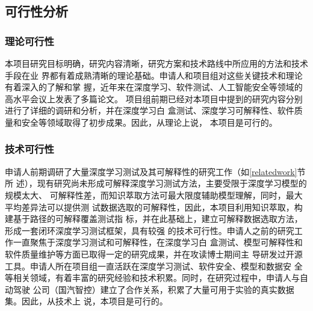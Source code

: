 \subsection{可行性分析}

\subsubsection{理论可行性}

本项目研究目标明确，研究内容清晰，研究方案和技术路线中所应用的方法和技术手段在业
界都有着成熟清晰的理论基础。申请人和项目组对这些关键技术和理论有着深入的了解和掌
握，近年来在深度学习、软件测试、人工智能安全等领域的高水平会议上发表了多篇论文。
项目组前期已经对本项目中提到的研究内容分别进行了详细的调研和分析，并在深度学习白
盒测试、深度学习可解释性、软件质量和安全等领域取得了初步成果。因此，从理论上说，
本项目是可行的。

\subsubsection{技术可行性}

申请人前期调研了大量深度学习测试及其可解释性的研究工作（如\ref{relatedwork}节所
述），现有研究尚未形成可解释深度学习测试方法，主要受限于深度学习模型的规模太大、
可解释性差，而知识萃取方法可最大限度辅助模型理解，同时，最大平均差异法可以提供测
试数据选取的可解释性，因此，本项目利用知识萃取，构建基于路径的可解释覆盖测试指
标，并在此基础上，建立可解释数据选取方法，形成一套闭环深度学习测试框架，具有较强
的技术可行性。申请人之前的研究工作一直聚焦于深度学习测试和可解释性，在深度学习白
盒测试、模型可解释性和软件质量维护等方面已取得一定的研究成果，并在攻读博士期间主
导研发过开源工具。申请人所在项目组一直活跃在深度学习测试、软件安全、模型和数据安
全等相关领域，有着丰富的研究经验和技术积累。同时，在研究过程中，申请人与自动驾驶
公司（国汽智控）建立了合作关系，积累了大量可用于实验的真实数据集。因此，从技术上
说，本项目是可行的。

\iffalse
\subsubsection{团队合理性}

项目组在深度学习测试和模型安全具有一定的基础，积累了丰富的研究经验，在重要国际会
议上发表了多篇高水平论文，项目在开源软件开发和管理等方面也有丰富的积累，可为本项
目测试框架研发和开源推广提供保障。项目组梯队完善，队伍具有凝聚力和创造力，项目组
成员每周定期讨论，有着良好的科研氛围，同时对本项目的研究内容具有浓厚的研究兴趣。
申请人有着长期广泛的国内外合作者，申请人与合作导师Hua Ji教授，本学院的刘哲理教
授、范玲玲副教授，天津大学的陈森副教授等均有密切合作，他们一直活跃在软件测试、软
件安全和模型安全等领域的学术前沿，可为本项目提供技术指导。此外，申请人与联合培养
时的导师新加坡国立大学教授Siau-Cheng Kho一直保持密切联系，Kho教授长期从事软件安
全和深度学习方面的研究，是软件工程和软件安全方面非常活跃的科学家；申请人与新加坡
南洋理工大学教授Yang Liu合作密切，Liu教授在软件工程、开源软件分析域管理等方面有
着丰富且深入的研究，是相关领域的引领者。两位国际知名专家可为本项目提供技术指导。
\fi